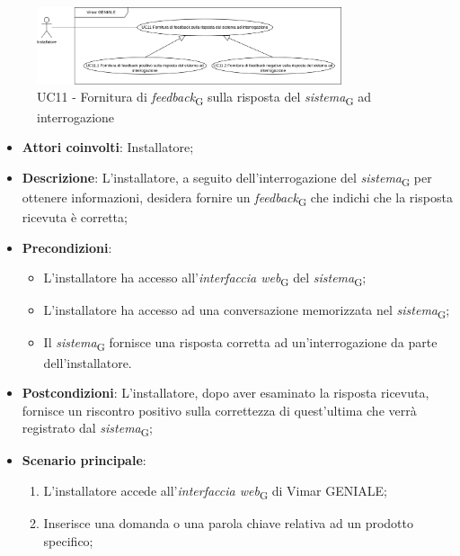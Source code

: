 \begin{figure}[H]
\centering
\includegraphics[width=0.8\textwidth]{contents/casi_duso/png/UC11.png}
\caption{UC11 - Fornitura di \textit{feedback}\textsubscript{G} sulla risposta del \textit{sistema}\textsubscript{G} ad interrogazione}
\end{figure}

\begin{itemize}
    \item \textbf{Attori coinvolti}: Installatore;
    \item \textbf{Descrizione}: L’installatore, a seguito dell’interrogazione del \textit{sistema}\textsubscript{G} per ottenere informazioni, desidera fornire un \textit{feedback}\textsubscript{G} che indichi che la risposta ricevuta è corretta;
    \item \textbf{Precondizioni}: 
        \begin{itemize}
            \item L’installatore ha accesso all’\textit{interfaccia web}\textsubscript{G} del \textit{sistema}\textsubscript{G};
            \item L’installatore ha accesso ad una conversazione memorizzata nel \textit{sistema}\textsubscript{G};
            \item Il \textit{sistema}\textsubscript{G} fornisce una risposta corretta ad un’interrogazione da parte dell’installatore.
        \end{itemize}
    \item \textbf{Postcondizioni}: L’installatore, dopo aver esaminato la risposta ricevuta, fornisce un riscontro positivo sulla correttezza di quest’ultima che verrà registrato dal \textit{sistema}\textsubscript{G};
    \item \textbf{Scenario principale}:
    \begin{enumerate}
    \item L’installatore accede all’\textit{interfaccia web}\textsubscript{G} di Vimar GENIALE;
    \item Inserisce una domanda o una parola chiave relativa ad un prodotto specifico;

\end{enumerate}
\end{itemize}
